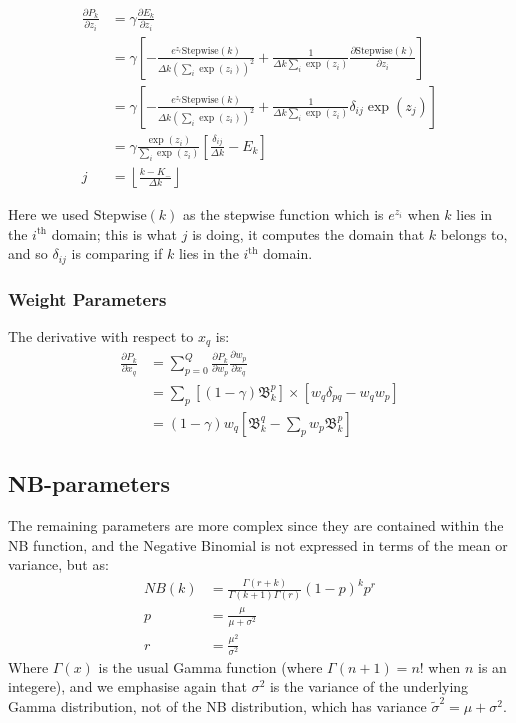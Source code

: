 \documentclass[fleqn,usenatbib]{acmart}
\newcommand{\pdiv}[2]{\frac{\partial #1}{\partial #2}}
\begin{document}
			\begin{align*}
				\pdiv{P_k}{z_i} & = \gamma \pdiv{E_k}{z_i}
				\\
				& = \gamma \left[-\frac{e^{z_i} \text{Stepwise}(k)}{\Delta k\left( \sum_{i} \exp(z_i)\right)^2} + \frac{1}{\Delta k \sum_{i} \exp(z_i)} \pdiv{\text{Stepwise}(k)}{z_i}\right]
				\\
				& = \gamma\left[-\frac{e^{z_i} \text{Stepwise}(k)}{\Delta k\left( \sum_{i} \exp(z_i)\right)^2} + \frac{1}{\Delta k \sum_{i} \exp(z_i)} \delta_{ij} \exp(z_j)\right]
				\\
				& = \gamma \frac{\exp(z_i)}{ \sum_{i} \exp(z_i)} \left[ \frac{\delta_{ij}}{\Delta k} - E_k \right]
				\\
				j & = \left\lfloor \frac{k - K_-}{\Delta k} \right\rfloor
			\end{align*}

			Here we used $\text{Stepwise}(k)$ as the stepwise function which is $e^{z_i}$ when $k$ lies in the $i^\text{th}$ domain; this is what $j$ is doing, it computes the domain that $k$ belongs to, and so $\delta_{ij}$ is comparing if $k$ lies in the $i^\text{th}$ domain.
		\subsubsection{Weight Parameters}

			The derivative with respect to $x_q$ is:
			\begin{align*}
				\pdiv{P_k}{x_q} & = \sum_{p=0}^Q \pdiv{P_k}{w_p} \pdiv{w_p}{x_q}
				\\
				& = \sum_p \left[ (1-\gamma) \mathfrak{B}_k^p\right] \times \left[ w_q \delta_{pq} - w_q w_p\right] 
				\\
				& = (1 - \gamma) w_q \left[ \mathfrak{B}_k^q - \sum_p w_p \mathfrak{B}_k^p\right]
			\end{align*}
			
		\subsection{NB-parameters}

			The remaining parameters are more complex since they are contained within the NB function, and the Negative Binomial is not expressed in terms of the mean or variance, but as:
			\begin{align}
				NB(k) & = \frac{\Gamma(r + k)}{\Gamma(k+1)\Gamma(r)} (1-p)^k p^r
				\\
				p & = \frac{\mu}{\mu + \sigma^2}
				\\
				r & = \frac{\mu^2}{\sigma^2}
			\end{align}
			Where $\Gamma(x)$ is the usual Gamma function (where $\Gamma(n+1) = n!$ when $n$ is an integere), and  we emphasise again that $\sigma^2$ is the variance of the underlying Gamma distribution, not of the NB distribution, which has variance $\tilde{\sigma}^2 = \mu + \sigma^2$.
		
\end{document}
